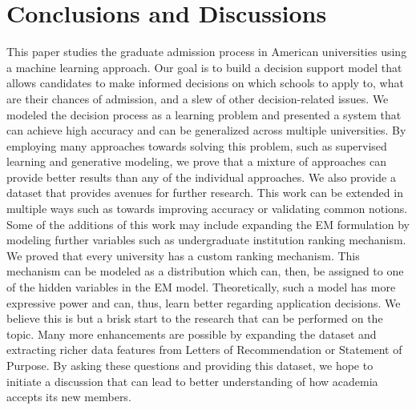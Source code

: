 \documentclass{sig-alternate-05-2015}
\begin{document}
\section{Conclusions and Discussions}
\label{sec:conclusions}
This paper studies the graduate admission process in American universities using a machine learning approach. Our goal is to build a decision support model that allows candidates to make informed decisions on which schools to apply to, what are their chances of admission, and a slew of other decision-related issues. We modeled the decision process as a learning problem and presented a system that can achieve high accuracy and can be generalized across multiple universities. By employing many approaches towards solving this problem, such as supervised learning and generative modeling, we prove that a mixture of approaches can provide better results than any of the individual approaches. We also provide a dataset that provides avenues for further research. This work can be extended in multiple ways such as towards improving accuracy or validating common notions. Some of the additions of this work may include expanding the EM formulation by modeling further variables such as undergraduate institution ranking mechanism. We proved that every university has a custom ranking mechanism. This mechanism can be modeled as a distribution which can, then, be assigned to one of the hidden variables in the EM model. Theoretically, such a model has more expressive power and can, thus, learn better regarding application decisions. We believe this is but a brisk start to the research that can be performed on the topic. Many more enhancements are possible by expanding the dataset and extracting richer data features from Letters of Recommendation or Statement of Purpose. By asking these questions and providing this dataset, we hope to initiate a discussion that can lead to better understanding of how academia accepts its new members.


%

%
%
\end{document}
